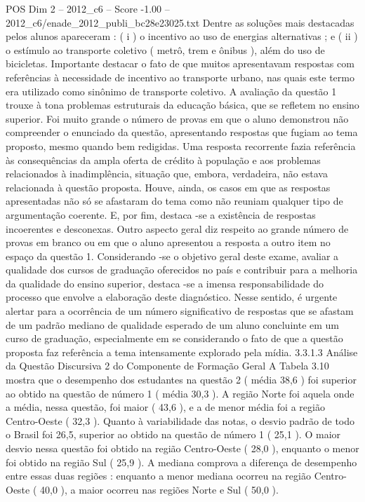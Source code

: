 \begin{textsample}{POS Dim 2 – 2012\_c6 – Score -1.00 – 2012\_c6/enade\_2012\_publi\_bc28e23025.txt}
Dentre as soluções mais destacadas pelos alunos apareceram : ( i ) o incentivo ao uso de energias alternativas ; e ( ii ) o estímulo ao transporte coletivo ( metrô, trem e ônibus ), além do uso de bicicletas.
Importante destacar o fato de que muitos apresentavam respostas com referências à necessidade de incentivo ao transporte urbano, nas quais este termo era utilizado como sinônimo de transporte coletivo.
A avaliação da questão 1 trouxe à tona problemas estruturais da educação básica, que se refletem no ensino superior.
Foi muito grande o número de provas em que o aluno demonstrou não compreender o enunciado da questão, apresentando respostas que fugiam ao tema proposto, mesmo quando bem redigidas.
Uma resposta recorrente fazia referência às consequências da ampla oferta de crédito à população e aos problemas relacionados à inadimplência, situação que, embora, verdadeira, não estava relacionada à questão proposta.
Houve, ainda, os casos em que as respostas apresentadas não só se afastaram do tema como não reuniam qualquer tipo de argumentação coerente.
E, por fim, destaca -se a existência de respostas incoerentes e desconexas.
Outro aspecto geral diz respeito ao grande número de provas em branco ou em que o aluno apresentou a resposta a outro item no espaço da questão 1.
Considerando -se o objetivo geral deste exame, avaliar a qualidade dos cursos de graduação oferecidos no país e contribuir para a melhoria da qualidade do ensino superior, destaca -se a imensa responsabilidade do processo que envolve a elaboração deste diagnóstico.
Nesse sentido, é urgente alertar para a ocorrência de um número significativo de respostas que se afastam de um padrão mediano de qualidade esperado de um aluno concluinte em um curso de graduação, especialmente em se considerando o fato de que a questão proposta faz referência a tema intensamente explorado pela mídia. 3.3.1.3 Análise da Questão Discursiva 2 do Componente de Formação Geral A Tabela 3.10 mostra que o desempenho dos estudantes na questão 2 ( média 38,6 ) foi superior ao obtido na questão de número 1 ( média 30,3 ).
A região Norte foi aquela onde a média, nessa questão, foi maior ( 43,6 ), e a de menor média foi a região Centro-Oeste ( 32,3 ).
Quanto à variabilidade das notas, o desvio padrão de todo o Brasil foi 26,5, superior ao obtido na questão de número 1 ( 25,1 ).
O maior desvio nessa questão foi obtido na região Centro-Oeste ( 28,0 ), enquanto o menor foi obtido na região Sul ( 25,9 ).
A mediana comprova a diferença de desempenho entre essas duas regiões : enquanto a menor mediana ocorreu na região Centro-Oeste ( 40,0 ), a maior ocorreu nas regiões Norte e Sul ( 50,0 ).

\end{textsample}
